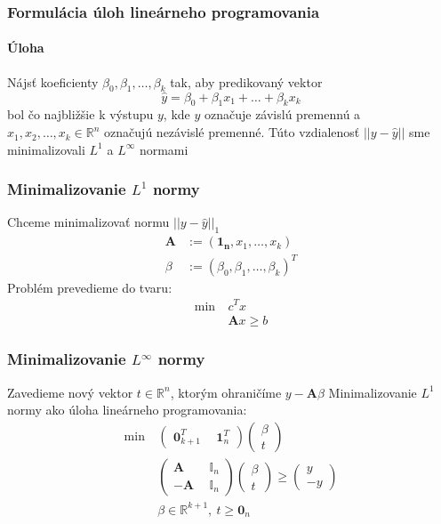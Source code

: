\documentclass[presentation.tex]{subfiles}
\begin{document}
	
	\begin{frame}
		\frametitle{Formulácia úloh lineárneho programovania}
		\framesubtitle{Úloha}
		   Nájsť koeficienty $\beta_0, \beta_1, \dots, \beta_k$ tak, aby predikovaný vektor 
		\begin{equation}
			\hat{y} = \beta_0 + \beta_1 x_1 + \ldots + \beta_k x_k
		\end{equation}
		bol čo najbližšie k výstupu $y$, kde $y$ označuje závislú premennú a $x_1, x_2, \dots, x_k \in \mathbb{R}^n$ označujú nezávislé premenné.
		Túto vzdialenosť $||y - \hat{y}||$ sme minimalizovali $L^1$ a $L^{\infty}$ normami
	\end{frame}
	
	\begin{frame}
		\frametitle{Minimalizovanie $L^1$ normy}
		Chceme minimalizovať normu $||y - \hat{y}||_1$ \\
		\begin{equation}\label{eq:notation}
			\begin{aligned}
			\mathbf{A} &:= (\mathbf{1_n}, x_1, \dots, x_k) \\
			\beta &:= (\beta_0, \beta_1, \dots, \beta_k)^T
			\end{aligned}
		\end{equation}
		\text Problém prevedieme do tvaru:
		\begin{align*}
			\text{min}~ &c^Tx\\
			&\mathbf{A}x \geq b
		\end{align*}
	\end{frame}
	
	\begin{frame}
		\frametitle{Minimalizovanie $L^{\infty}$ normy}
		\text Zavedieme nový vektor $t \in \mathbb{R}^n$, ktorým ohraničíme $y - \mathbf{A} \beta$
		Minimalizovanie $L^1$ normy ako úloha lineárneho programovania:
		\begin{align*}
			\text{min}~ &
			\left(
			\begin{array}{c|c}
				\mathbf{0}_{k+1}^T ~&~ \mathbf{1}_n^T
			\end{array}
			\right)
			\left(
			\begin{array}{c}
				\beta \\
				\hline
				t
			\end{array}
			\right) \\
			&\left(
			\begin{array}{c|c}
				\mathbf{A} ~&~ \mathbb{I}_n \\
				\hline
				-\mathbf{A} ~&~ \mathbb{I}_n
			\end{array}
			\right)
			\left(
			\begin{array}{c}
				\beta \\
				\hline
				t
			\end{array}
			\right)
			\geq
			\left(
			\begin{array}{c}
				y \\
				\hline
				-y
			\end{array}
			\right) \\
			&\beta \in \mathbb{R}^{k+1},~t \geq \mathbf{0}_{n}
		\end{align*}
	\end{frame}
	
\end{document}

